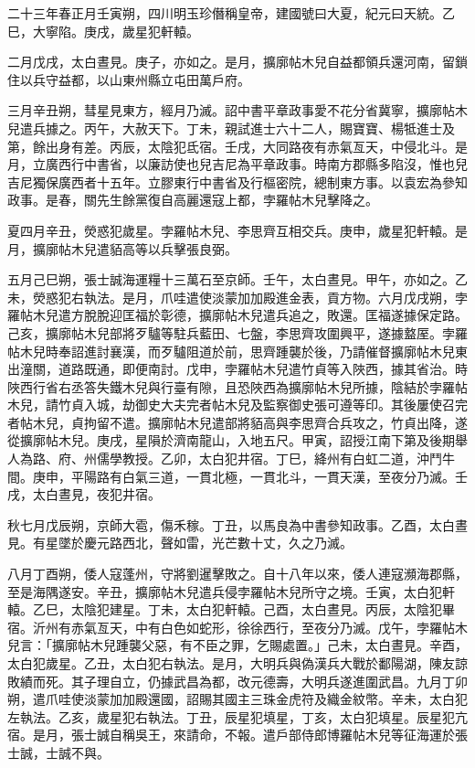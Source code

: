 \begin{pinyinscope}
 二十三年春正月壬寅朔，四川明玉珍僭稱皇帝，建國號曰大夏，紀元曰天統。乙巳，大寧陷。庚戌，歲星犯軒轅。



 二月戊戌，太白晝見。庚子，亦如之。是月，擴廓帖木兒自益都領兵還河南，留鎖住以兵守益都，以山東州縣立屯田萬戶府。



 三月辛丑朔，彗星見東方，經月乃滅。詔中書平章政事愛不花分省冀寧，擴廓帖木兒遣兵據之。丙午，大赦天下。丁未，親試進士六十二人，賜寶寶、楊牴進士及第，餘出身有差。丙辰，太陰犯氐宿。壬戌，大同路夜有赤氣亙天，中侵北斗。是月，立廣西行中書省，以廉訪使也兒吉尼為平章政事。時南方郡縣多陷沒，惟也兒吉尼獨保廣西者十五年。立膠東行中書省及行樞密院，總制東方事。以袁宏為參知政事。是春，關先生餘黨復自高麗還寇上都，孛羅帖木兒擊降之。



 夏四月辛丑，熒惑犯歲星。孛羅帖木兒、李思齊互相交兵。庚申，歲星犯軒轅。是月，擴廓帖木兒遣貊高等以兵擊張良弼。



 五月己巳朔，張士誠海運糧十三萬石至京師。壬午，太白晝見。甲午，亦如之。乙未，熒惑犯右執法。是月，爪哇遣使淡蒙加加殿進金表，貢方物。六月戊戌朔，孛羅帖木兒遣方脫脫迎匡福於彰德，擴廓帖木兒遣兵追之，敗還。匡福遂據保定路。己亥，擴廓帖木兒部將歹驢等駐兵藍田、七盤，李思齊攻圍興平，遂據盩厔。孛羅帖木兒時奉詔進討襄漢，而歹驢阻道於前，思齊踵襲於後，乃請催督擴廓帖木兒東出潼關，道路既通，即便南討。戊申，孛羅帖木兒遣竹貞等入陜西，據其省治。時陜西行省右丞答失鐵木兒與行臺有隙，且恐陜西為擴廓帖木兒所據，陰結於孛羅帖木兒，請竹貞入城，劫御史大夫完者帖木兒及監察御史張可遵等印。其後屢使召完者帖木兒，貞拘留不遣。擴廓帖木兒遣部將貊高與李思齊合兵攻之，竹貞出降，遂從擴廓帖木兒。庚戌，星隕於濟南龍山，入地五尺。甲寅，詔授江南下第及後期舉人為路、府、州儒學教授。乙卯，太白犯井宿。丁巳，絳州有白虹二道，沖鬥牛間。庚申，平陽路有白氣三道，一貫北極，一貫北斗，一貫天漢，至夜分乃滅。壬戌，太白晝見，夜犯井宿。



 秋七月戊辰朔，京師大雹，傷禾稼。丁丑，以馬良為中書參知政事。乙酉，太白晝見。有星墜於慶元路西北，聲如雷，光芒數十丈，久之乃滅。



 八月丁酉朔，倭人寇蓬州，守將劉暹擊敗之。自十八年以來，倭人連寇瀕海郡縣，至是海隅遂安。辛丑，擴廓帖木兒遣兵侵孛羅帖木兒所守之境。壬寅，太白犯軒轅。乙巳，太陰犯建星。丁未，太白犯軒轅。己酉，太白晝見。丙辰，太陰犯畢宿。沂州有赤氣亙天，中有白色如蛇形，徐徐西行，至夜分乃滅。戊午，孛羅帖木兒言：「擴廓帖木兒踵襲父惡，有不臣之罪，乞賜處置。」己未，太白晝見。辛酉，太白犯歲星。乙丑，太白犯右執法。是月，大明兵與偽漢兵大戰於鄱陽湖，陳友諒敗績而死。其子理自立，仍據武昌為都，改元德壽，大明兵遂進圍武昌。九月丁卯朔，遣爪哇使淡蒙加加殿還國，詔賜其國主三珠金虎符及織金紋幣。辛未，太白犯左執法。乙亥，歲星犯右執法。丁丑，辰星犯填星，丁亥，太白犯填星。辰星犯亢宿。是月，張士誠自稱吳王，來請命，不報。遣戶部侍郎博羅帖木兒等征海運於張士誠，士誠不與。




\end{pinyinscope}
